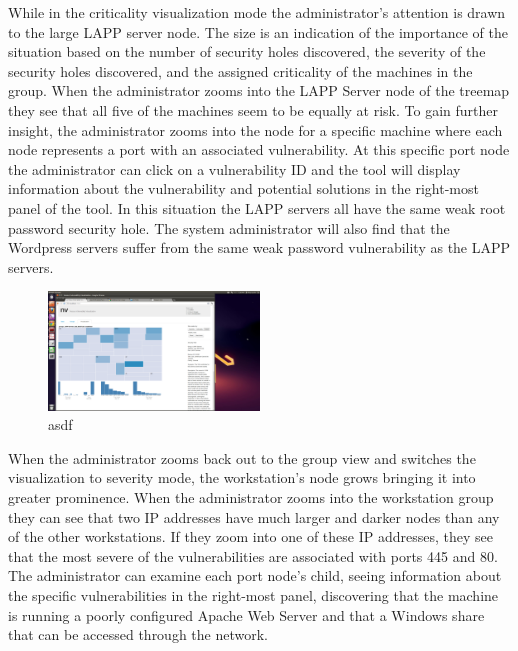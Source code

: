 \documentclass{acm_proc_article-sp}
\begin{document}
While in the criticality visualization mode the administrator's attention is
drawn to the large LAPP server node. The size is an indication of the
importance of the situation based on the number of security holes discovered,
the severity of the security holes discovered, and the assigned criticality of
the machines in the group. When the administrator zooms into the LAPP Server
node of the treemap they see that all five of the machines seem to be equally
at risk. To gain further insight, the administrator zooms into the node for a
specific machine where each node represents a port with an associated
vulnerability. At this specific port node the administrator can click on a
vulnerability ID and the tool will display information about the vulnerability
and potential solutions in the right-most panel of the tool. In this situation the LAPP servers all have the same
weak root password security hole. The system administrator will also find that
the Wordpress servers suffer from the same weak password vulnerability as the
LAPP servers.

\begin{figure}
  \centering
  \includegraphics[width=0.5\textwidth]{../screenshots/final/LAPPServerSimPort}
  \caption{asdf}
\end{figure}

When the administrator zooms back out to the
group view and switches the visualization to severity mode, the workstation's
node grows bringing it into greater prominence. When the administrator
zooms into the workstation group they can see that two IP addresses have much
larger and darker nodes than any of the other workstations. If they zoom into
one of these IP addresses, they see that the most severe of the vulnerabilities
are associated with ports 445 and 80. The administrator can examine each port
node's child, seeing information about the specific vulnerabilities in the right-most
panel, discovering that the machine is running a poorly configured Apache
Web Server and that a Windows share that can be accessed through the network.
\end{document}
